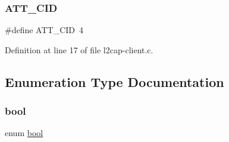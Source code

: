 \subsubsection{\texorpdfstring{A\+T\+T\+\_\+\+C\+ID}{ATT\_CID}}
{\footnotesize\ttfamily \#define A\+T\+T\+\_\+\+C\+ID~4}



Definition at line 17 of file l2cap-\/client.\+c.



\subsection{Enumeration Type Documentation}
\mbox{\label{piconet_2l2cap-client_8c_af6a258d8f3ee5206d682d799316314b1}} 
\subsubsection{\texorpdfstring{bool}{bool}}
{\footnotesize\ttfamily enum \mbox{\hyperlink{piconet_2l2cap-client_8c_af6a258d8f3ee5206d682d799316314b1}{bool}}}

